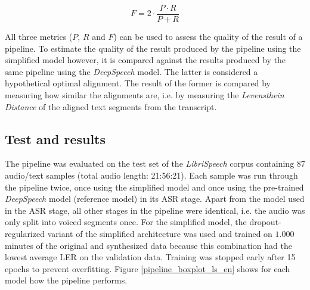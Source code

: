 \[ 
F = 2\cdot \frac{P\cdot R}{P+R}
 \]

All three metrics ($P$, $R$ and $F$) can be used to assess the quality of the result of a pipeline. To estimate the quality of the result produced by the pipeline using the simplified model however, it is compared against the results produced by the same pipeline using the \textit{DeepSpeech} model. The latter is considered a hypothetical optimal alignment. The result of the former is compared by measuring how similar the alignments are, i.e. by measuring the \textit{Levensthein Distance} of the aligned text segments from the transcript.

\subsection{Test and results}

The pipeline was evaluated on the test set of the \textit{LibriSpeech} corpus containing 87 audio/text samples (total audio length: 21:56:21). Each sample was run through the pipeline twice, once using the simplified model and once using the pre-trained \textit{DeepSpeech} model (reference model) in its \ac{ASR} stage. Apart from the model used in the \ac{ASR} stage, all other stages in the pipeline were identical, i.e. the audio was only split into voiced segments once. For the simplified model, the dropout-regularized variant of the simplified architecture was used and trained on $1.000$ minutes of the original and synthesized data because this combination had the lowest average \ac{LER} on the validation data. Training was stopped early after 15 epochs to prevent overfitting. Figure \ref{pipeline_boxplot_ls_en} shows for each model how the pipeline performs. 

